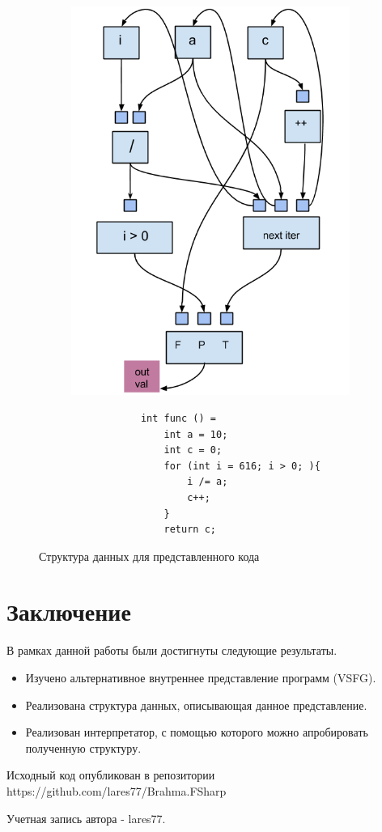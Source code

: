 \documentclass{matmex-diploma-custom}
\begin{document}
\begin{figure}[t]
    \centering
    \begin{subfigure}[h]{0.3\textwidth}
        \includegraphics[width=\textwidth]{example.png}
    \end{subfigure}
    \begin{subfigure}[h]{0.6\textwidth}
        \begin{verbatim}
            int func () = 
                int a = 10;
                int c = 0;
                for (int i = 616; i > 0; ){
                    i /= a;
                    c++;
                }
                return c;
        \end{verbatim}
    \end{subfigure}
    \caption{Структура данных для представленного кода}
    \label{example}
\end{figure}

\section*{Заключение}
В рамках данной работы были достигнуты следующие результаты.
\begin{itemize}
    \item Изучено альтернативное внутреннее представление программ (VSFG).
    \item Реализована структура данных, описывающая данное представление.
    \item Реализован интерпретатор, с помощью которого можно апробировать полученную структуру.
\end{itemize}

Исходный код опубликован в репозитории https://github.com/lares77/Brahma.FSharp

Учетная запись автора - lares77.



\end{document}
